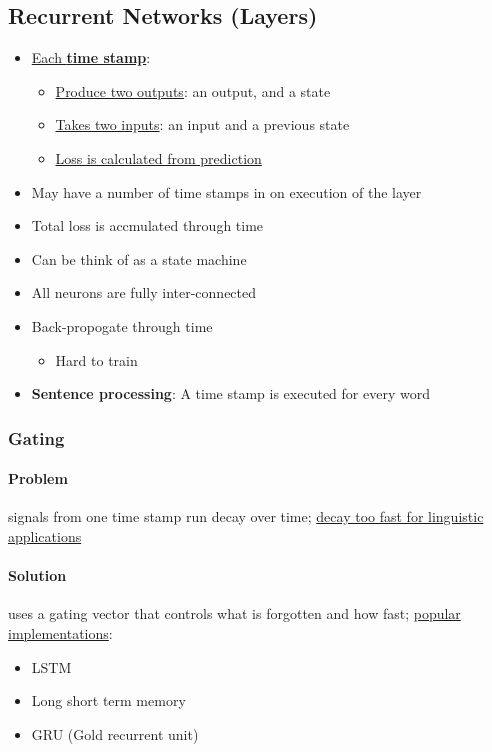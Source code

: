   \subsection{Recurrent Networks (Layers)}

    \begin{itemize}
      \item \ul{Each \textbf{time stamp}}:
      \begin{itemize}
        \item \ul{Produce two outputs}: an output, and a state
        \item \ul{Takes two inputs}: an input and a previous state
        \item \ul{Loss is calculated from prediction}
      \end{itemize}

      \item May have a number of time stamps in on execution of the layer
      \item Total loss is accmulated through time
      \item Can be think of as a state machine
      \item All neurons are fully inter-connected
      \item Back-propogate through time
      \begin{itemize}
        \item Hard to train
      \end{itemize}

      \item \textbf{Sentence processing}: A time stamp is executed
      for every word
    \end{itemize}

    \subsubsection{Gating}

      \paragraph{Problem} signals from one time stamp run decay over time;
      \ul{decay too fast for linguistic applications}

      \paragraph{Solution} uses a gating vector that controls what is
      forgotten and how fast; \ul{popular implementations}:
      \begin{itemize}
        \item LSTM
        \item Long short term memory
        \item GRU (Gold recurrent unit)
      \end{itemize}

